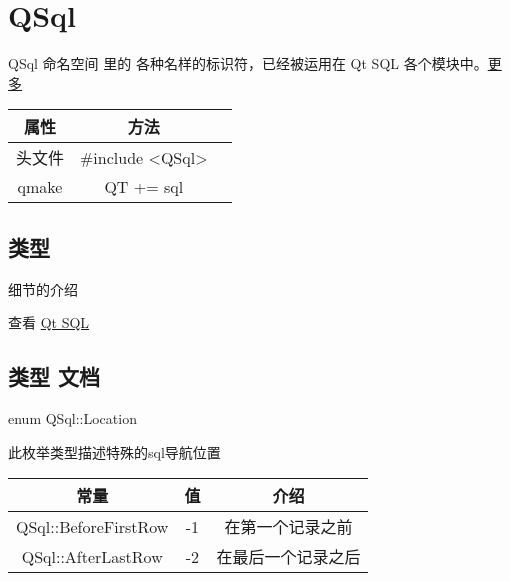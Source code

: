 \chapter{QSql}

QSql 命名空间 里的 各种名样的标识符，已经被运用在 Qt SQL 各个模块中。\href{https://doc.qt.io/qt-5/qsql.html#details}{更多} 

\begin{tabular}{|c|c|p{1.5cm}|}
	\hline
	属性 & 方法 \\
	\hline
	头文件 & \#include <QSql>\\      
	\hline
	qmake & QT += sql\\      
	\hline
\end{tabular}

\section{类型}


细节的介绍 

查看 \href{https://doc.qt.io/qt-5/qtsql-index.html}{Qt SQL}

\section{类型 文档}

enum QSql::Location


此枚举类型描述特殊的sql导航位置


\begin{tabular}{|c|c|c|}
	\hline
	常量	& 值 & 介绍 \\
	\hline
	QSql::BeforeFirstRow&-1&在第一个记录之前\\
	\hline
	QSql::AfterLastRow&-2&在最后一个记录之后\\
	\hline
\end{tabular}

